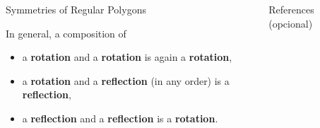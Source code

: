 \documentclass[final]{beamer}
\newlength{\sepwidth}
\newlength{\colwidth}
\newcommand{\separatorcolumn}{\begin{column}{\sepwidth}\end{column}}
\begin{document}
\begin{frame}[t]
\begin{columns}[t]
\begin{column}{\colwidth}
\begin{alertblock}{Symmetries of Regular Polygons}
\begin{figure}[H]
  \end{figure}
  In general, a composition of
  \begin{itemize}[label=\textcolor{gevodarkblue}{\textbullet},leftmargin=3ex]
   \item a \textbf{rotation} and a \textbf{rotation} is again a
    \textbf{rotation},
   \item a \textbf{rotation} and a \textbf{reflection} (in any order) is a
    \textbf{reflection},
   \item a \textbf{reflection} and a \textbf{reflection} is a \textbf{rotation}.
  \end{itemize}
 \end{alertblock}

\end{column}
\separatorcolumn

\begin{column}{\colwidth}

 \begin{block}{References (opcional)}
  \nocite{*}
  \footnotesize{}
 \end{block}

\end{column}
\separatorcolumn

\end{columns}
\end{frame}
\end{document}
